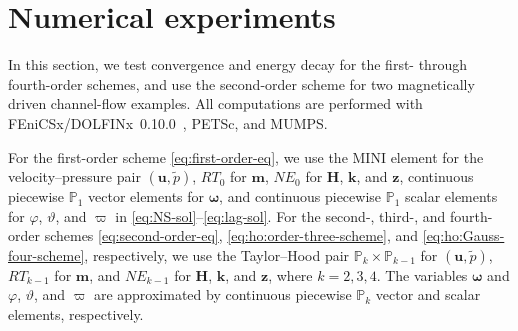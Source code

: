 \documentclass[11pt,a4paper]{article}
\newcommand{\bs}{\boldsymbol}
\theoremstyle{definition}
\numberwithin{equation}{section}
\begin{document}
\section{Numerical experiments}
\label{sec:numerics}

In this section, we test convergence and energy decay for the
first- through fourth-order schemes, and use the second-order scheme
for two magnetically driven channel-flow examples. All computations
are performed with FEniCSx/DOLFINx~0.10.0~\cite{Barattafenics},
PETSc, and MUMPS.

For the first-order scheme \eqref{eq:first-order-eq}, we use the
MINI element for the velocity--pressure pair $(\bs u,\tilde p)$,
$RT_0$ for $\bs m$, $NE_0$ for $\bs H$, $\bs k$, and $\bs z$,
continuous piecewise $\mathbb P_1$ vector elements for $\bs\omega$,
and continuous piecewise $\mathbb P_1$ scalar elements for
$\varphi$, $\vartheta$, and $\varpi$ in
\eqref{eq:NS-sol}--\eqref{eq:lag-sol}. For the second-, third-,
and fourth-order schemes
\eqref{eq:second-order-eq},
\eqref{eq:ho:order-three-scheme}, and
\eqref{eq:ho:Gauss-four-scheme}, respectively, we use the
Taylor--Hood pair $\mathbb P_k\times\mathbb P_{k-1}$ for
$(\bs u,\tilde p)$, $RT_{k-1}$ for $\bs m$, and $NE_{k-1}$ for
$\bs H$, $\bs k$, and $\bs z$, where $k=2,3,4$. The variables
$\bs\omega$ and $\varphi$, $\vartheta$, and $\varpi$ are
approximated by continuous piecewise $\mathbb P_k$ vector and scalar
elements, respectively.

%
\end{document}
